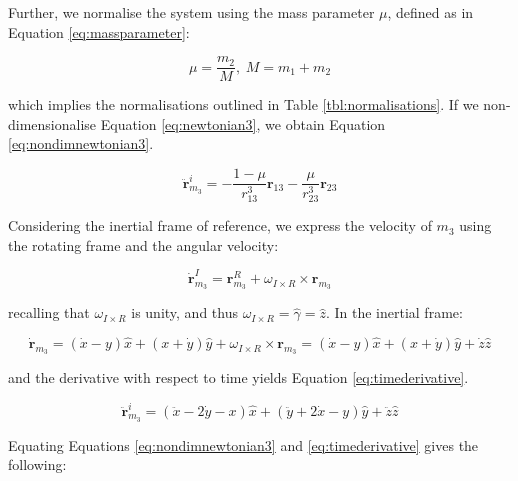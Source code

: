 \noindent Further, we normalise the system using the mass parameter $\mu$, defined as in Equation \ref{eq:massparameter}:

\begin{equation}\label{eq:massparameter}
\mu = \frac{m_2}{M}, \hspace{3pt} M = m_1 + m_2
\end{equation}

\noindent which implies the normalisations outlined in Table \ref{tbl:normalisations}. If we non-dimensionalise Equation \ref{eq:newtonian3}, we obtain Equation \ref{eq:nondimnewtonian3}.

\begin{equation}\label{eq:nondimnewtonian3}
\ddot{\pmb{r}}^i_{m_3} = -\frac{1-\mu}{r^3_{13}}\pmb{r}_{13} - \frac{\mu}{r^3_{23}} \pmb{r}_{23}
\end{equation}

\noindent Considering the inertial frame of reference, we express the velocity of $m_3$ using the rotating frame and the angular velocity:

\begin{equation}
\dot{\pmb{r}}^I_{m_3} = \pmb{r}^R_{m_3} + \omega_{I\times R} \times \pmb{r}_{m_3}
\end{equation}

\noindent recalling that $\omega_{I\times R}$ is unity, and thus $\omega_{I\times R} = \hat{\gamma} = \hat{z}$. In the inertial frame:

\begin{equation}
\dot{\pmb{r}}_{m_3} = (\dot{x} - y)\hat{x} + (x+\dot{y})\hat{y} + \omega_{I\times R} \times \pmb{r}_{m_3} = (\dot{x} - y)\hat{x} + (x+\dot{y})\hat{y} + \dot{z}\hat{z}
\end{equation}

\noindent and the derivative with respect to time yields Equation \ref{eq:timederivative}.

\begin{equation}\label{eq:timederivative}
\ddot{\pmb{r}}^i_{m_3} = (\ddot{x} - 2\dot{y} - x)\hat{x} + (\ddot{y} + 2\dot{x} - y)\hat{y} + \ddot{z}\hat{z}
\end{equation}

Equating Equations \ref{eq:nondimnewtonian3} and \ref{eq:timederivative} gives the following:

